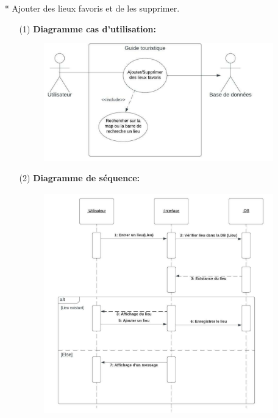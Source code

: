 \documentclass[12pt]{article}
\begin{document}
\begin{itemize}
	\item[* ] Ajouter des lieux favoris et de les supprimer.
		\begin{itemize}
		\item[(1)] \textbf{Diagramme cas d'utilisation:}
	\begin{figure}[!hbtp]
		\centering
		\includegraphics[scale=0.75]{Capture3_s.PNG}
	\end{figure}
\item[(2)] \textbf{Diagramme de séquence:}
\begin{figure}[!hbtp]
	\centering
	\includegraphics[scale=0.75]{Capture3_2.PNG}
\end{figure}
\end{itemize}
\end{itemize}
\end{document}
